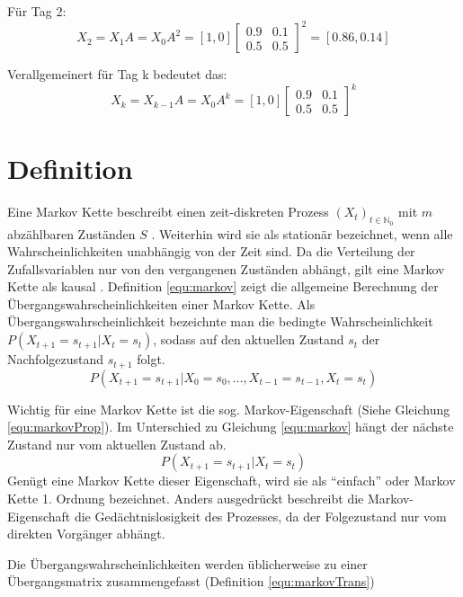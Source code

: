 Für Tag 2:\\
\[ X_2 = X_1 A = X_0 A^2 = [ 1, 0 ] \begin {bmatrix} 0.9&0.1\\0.5&0.5 \end {bmatrix}^2 = [ 0.86, 0.14] \] 

Verallgemeinert für Tag k bedeutet das: 
\[ X_k = X_{k-1} A = X_0 A^k = [ 1, 0 ] \begin {bmatrix} 0.9&0.1\\0.5&0.5 \end {bmatrix}^k \] 


\section{Definition}
Eine Markov Kette beschreibt einen zeit-diskreten Prozess \((X_t)_{t\in\mathbb{N}_0}\) mit  \(m\) abzählbaren Zuständen \(S\) \cite{stochMod}.
Weiterhin wird sie als stationär bezeichnet, wenn alle Wahrscheinlichkeiten unabhängig von der Zeit sind.
Da die Verteilung der Zufallsvariablen nur von den vergangenen Zuständen abhängt, gilt eine Markov Kette als kausal \cite[48]{mmmFink}.
Definition \ref{equ:markov} zeigt die allgemeine Berechnung der Übergangswahrscheinlichkeiten einer Markov Kette. Als Übergangswahrscheinlichkeit bezeichnte man die bedingte Wahrscheinlichkeit \(P ( X_{t+1} = s_{t+1} | X_{t} = s_{t} ) \), sodass auf 
den aktuellen Zustand \( s_{t}\) der Nachfolgezustand \( s_{t+1}\) folgt. 
\begin{equation}
\label{equ:markov}
P (X_{t+1} = s_{t+1} | X_0 = s_0, \ldots , X_{t-1} = s_{t-1}, X_{t} = s_{t})
\end{equation}

Wichtig für eine Markov Kette ist die sog. Markov-Eigenschaft (Siehe Gleichung \ref{equ:markovProp}). Im Unterschied zu Gleichung \ref{equ:markov} hängt der nächste Zustand nur vom aktuellen Zustand ab. 
\begin{equation}
\label{equ:markovProp}
P ( X_{t+1} = s_{t+1} | X_{t} = s_{t} ) 
\end{equation}
Genügt eine Markov Kette dieser Eigenschaft, wird sie als ``einfach'' oder Markov Kette 1. Ordnung bezeichnet.
Anders ausgedrückt beschreibt die Markov-Eigenschaft die Gedächtnislosigkeit des Prozesses, da der Folgezustand nur vom direkten Vorgänger abhängt.

Die Übergangswahrscheinlichkeiten werden üblicherweise zu einer Übergangsmatrix zusammengefasst (Definition \ref{equ:markovTrans}) 

